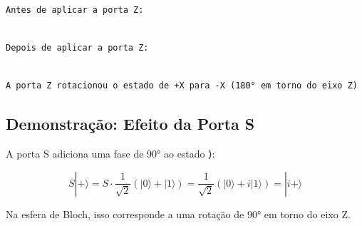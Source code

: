 \documentclass[
  brazilian,
]{report}
\begin{document}
\begin{verbatim}
Antes de aplicar a porta Z:
\end{verbatim}

\begin{verbatim}

Depois de aplicar a porta Z:
\end{verbatim}

\begin{verbatim}

A porta Z rotacionou o estado de +X para -X (180° em torno do eixo Z)
\end{verbatim}

\subsection{Demonstração: Efeito da Porta
S}\label{demonstrauxe7uxe3o-efeito-da-porta-s}

A porta S adiciona uma fase de 90° ao estado ⟩:

\[S|+⟩ = S · \frac{1}{\sqrt{2}}(|0⟩ + |1⟩) = \frac{1}{\sqrt{2}}(|0⟩ + i|1⟩) = |i+⟩\]

Na esfera de Bloch, isso corresponde a uma rotação de 90° em torno do
eixo Z.
\end{document}
